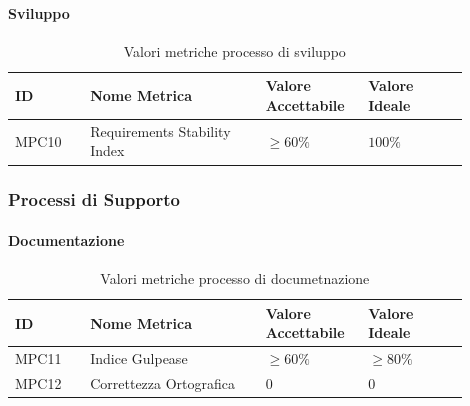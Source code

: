\documentclass[a4paper,12pt]{article}
\begin{document}
                    \paragraph{Sviluppo} \mbox{}

                        \begin{longtable}{|M{0.15\linewidth}|M{0.35\linewidth}|M{0.2\linewidth}|M{0.2\linewidth}|}

                        \caption{Valori metriche processo di sviluppo} \\
                        \hline
                        \textbf{ID} & \textbf{Nome Metrica} & \textbf{Valore Accettabile} & \textbf{Valore Ideale} \\
                        \hline
                        \endhead

                        MPC10 & Requirements Stability Index & $\ge 60\%$ & $100\%$ \\
                        \hline

                    \end{longtable}


            \subsubsection{Processi di Supporto}
                \paragraph{Documentazione} \mbox{}
                    \begin{longtable}{|M{0.15\linewidth}|M{0.35\linewidth}|M{0.2\linewidth}|M{0.2\linewidth}|}

                        \caption{Valori metriche processo di documetnazione} \\
                        \hline
                        \textbf{ID} & \textbf{Nome Metrica} & \textbf{Valore Accettabile} & \textbf{Valore Ideale} \\
                        \hline
                        \endhead

                        MPC11 & Indice Gulpease & $\ge 60\%$ & $\ge 80\%$ \\
                        \hline

                        MPC12 & Correttezza Ortografica & $0$ & $0$ \\
                        \hline

                    \end{longtable}
\end{document}
